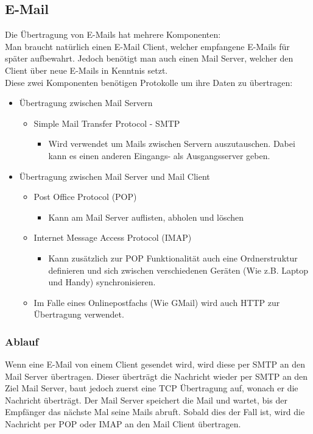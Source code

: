\documentclass{article}
\begin{document}
	 \subsection{E-Mail}
	 Die Übertragung von E-Mails hat mehrere Komponenten: \\
	 Man braucht natürlich einen E-Mail Client, welcher empfangene E-Mails für später aufbewahrt. Jedoch benötigt man auch einen Mail Server, welcher den Client über neue E-Mails in Kenntnis setzt. \\
	 Diese zwei Komponenten benötigen Protokolle um ihre Daten zu übertragen:
	 \begin{itemize}
	 	\item{Übertragung zwischen Mail Servern}
		\begin{itemize}
	 		\item{Simple Mail Transfer Protocol - SMTP}
		 	\begin{itemize}
		 		\item{Wird verwendet um Mails zwischen Servern auszutauschen. Dabei kann es einen anderen Eingangs- als Ausgangsserver geben.}
		 	\end{itemize}
		\end{itemize}
		\item{Übertragung zwischen Mail Server und Mail Client}
		\begin{itemize}
			\item{Post Office Protocol (POP)}
			\begin{itemize}
				\item{Kann am Mail Server auflisten, abholen und löschen}
			\end{itemize}
			\item{Internet Message Access Protocol (IMAP)}
			\begin{itemize}
				\item{Kann zusätzlich zur POP Funktionalität auch eine Ordnerstruktur definieren und sich zwischen verschiedenen Geräten (Wie z.B. Laptop und Handy) synchronisieren.}
			\end{itemize}
			\item{Im Falle eines Onlinepostfachs (Wie GMail) wird auch HTTP zur Übertragung verwendet.}
		\end{itemize}
	 \end{itemize}
	 \subsubsection{Ablauf}
	 Wenn eine E-Mail von einem Client gesendet wird, wird diese per SMTP an den Mail Server übertragen. Dieser überträgt die Nachricht wieder per SMTP an den Ziel Mail Server, baut jedoch zuerst eine TCP Übertragung auf, wonach er die Nachricht überträgt. Der Mail Server speichert die Mail und wartet, bis der Empfänger das nächste Mal seine Mails abruft. Sobald dies der Fall ist, wird die Nachricht per POP oder IMAP an den Mail Client übertragen.
\end{document}
